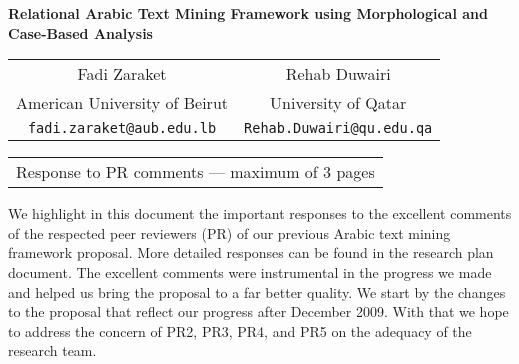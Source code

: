 \documentclass[12pt]{article}
\begin{document}
\pagestyle{fancy}
\chead{}

\cfoot{}
\renewcommand{\footrulewidth}{0.2pt}
\renewcommand{\headrulewidth}{0.2pt}


\begin{center}
{\Large \bf Relational Arabic Text Mining Framework using 
    Morphological
    and Case-Based Analysis }

\vspace{.1in}

\renewcommand{\arraystretch}{.6}
\begin{tabular}{cc}
Fadi Zaraket & Rehab Duwairi \\
American University of Beirut & University of Qatar \\
{\tt fadi.zaraket@aub.edu.lb} & {\tt Rehab.Duwairi@qu.edu.qa}
\end{tabular}

\vspace{.1in}

\renewcommand{\arraystretch}{.6}
\begin{tabular}{c}
{\small Response to PR comments --- maximum of 3 pages} \\
\end{tabular}
\vspace{.1in}

\date{\today}
\end{center}

We highlight in this document the important responses to the 
excellent comments of
the respected peer reviewers (PR) of our previous Arabic text mining
framework proposal.
More detailed responses can be found in the research plan document. 
The excellent comments were instrumental in the 
progress we made and helped us bring the proposal to a far better 
quality.
We start by the changes to the proposal 
that reflect our progress after December 2009.
With that we hope to address the concern of PR2, PR3, PR4,
and PR5 on the adequacy of the research team. 
\end{document}
